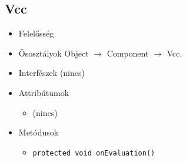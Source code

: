 \subsection{Vcc}
\begin{itemize}
\item Felelősség

\item Ősosztályok Object $\rightarrow{}$ Component $\rightarrow{}$ Vcc.
\item Interfészek (nincs)
\item Attribútumok $\ $
\begin{itemize}
\item (nincs)
\end{itemize}
\item Metódusok$\ $
\begin{itemize}
	\item \texttt{protected void onEvaluation()} 
\end{itemize}
\end{itemize}

